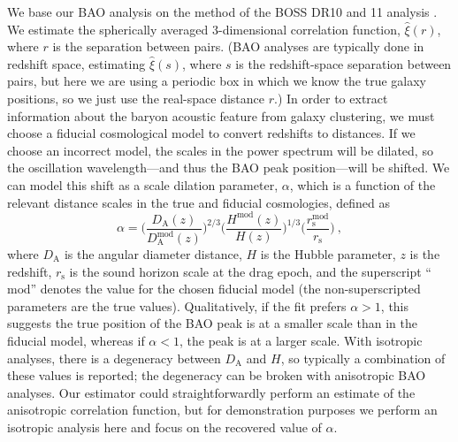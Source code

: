 \documentclass[modern]{aastex62}
\begin{document}
We base our BAO analysis on the method of the BOSS DR10 and 11 analysis \citep{Anderson2014}.
We estimate the spherically averaged 3-dimensional correlation function, $\hat{\xi}(r)$, where $r$ is the separation between pairs.
(BAO analyses are typically done in redshift space, estimating $\hat{\xi}(s)$, where $s$ is the redshift-space separation between pairs, but here we are using a periodic box in which we know the true galaxy positions, so we just use the real-space distance $r$.)
In order to extract information about the baryon acoustic feature from galaxy clustering, we must choose a fiducial cosmological model to convert redshifts to distances.
If we choose an incorrect model, the scales in the power spectrum will be dilated, so the oscillation wavelength---and thus the BAO peak position---will be shifted.
We can model this shift as a scale dilation parameter, $\alpha$, which is a function of the relevant distance scales in the true and fiducial cosmologies, defined as
\begin{equation} \label{eq:alpha}
\alpha = \Bigg( \frac{D_\mathrm{A}(z)}{D_\mathrm{A}^{\text{mod}}(z)} \Bigg)^{2/3} \Bigg( \frac{H^{\text{mod}}(z)}{H(z)} \Bigg)^{1/3} \Bigg( \frac{r_\mathrm{s}^{\text{mod}}}{r_\mathrm{s}} \Bigg) ~,
\end{equation}
where $D_\mathrm{A}$ is the angular diameter distance, $H$ is the Hubble parameter, $z$ is the redshift, $r_\mathrm{s}$ is the sound horizon scale at the drag epoch, and the superscript ``$\text{mod}$'' denotes the value for the chosen fiducial model (the non-superscripted parameters are the true values).
Qualitatively, if the fit prefers $\alpha>1$, this suggests the true position of the BAO peak is at a smaller scale than in the fiducial model, whereas if $\alpha<1$, the peak is at a larger scale.
With isotropic analyses, there is a degeneracy between $D_\mathrm{A}$ and $H$, so typically a combination of these values is reported; the degeneracy can be broken with anisotropic BAO analyses.
Our estimator could straightforwardly perform an estimate of the anisotropic correlation function, but for demonstration purposes we perform an isotropic analysis here and focus on the recovered value of $\alpha$.
\end{document}
